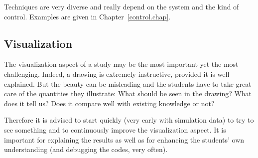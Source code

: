 Techniques are very diverse and really depend on the system and the kind of control. Examples are given in Chapter~\ref{control.chap}.

\subsection{Visualization}\label{visualization.sec}
The visualization aspect of a study may be the most important yet the most challenging. Indeed, a drawing is extremely instructive, provided it is well explained. But the beauty can be misleading and the students have to take great care of the quantities they illustrate: What should be seen in the drawing? What does it tell us? Does it compare well with existing knowledge or not?

Therefore it is advised to start quickly (very early with simulation data) to try to see something and to continuously improve the visualization aspect. It is important for explaining the results as well as for enhancing the students' own understanding (and debugging the codes, very often).
